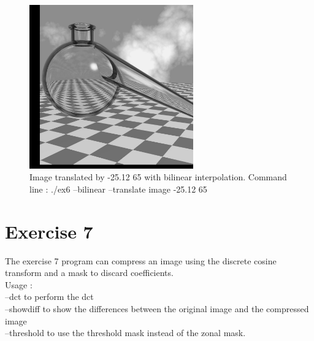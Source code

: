 \documentclass[10pt]{article}
\begin{document}
\begin{figure}[!ht]
	\centering
	\includegraphics[height=200pt]{./ex6/translate2.jpg}
	\caption{Image translated by -25.12 65 with bilinear interpolation. Command line : ./ex6 --bilinear --translate image -25.12 65}
\end{figure}
\clearpage
\section{Exercise 7}
The exercise 7 program can compress an image using the discrete cosine transform and a mask to discard coefficients.\\

Usage :\\
--dct to perform the dct\\
--showdiff to show the differences between the original image and the compressed image\\

--threshold to use the threshold mask instead of the zonal mask.
\end{document}
